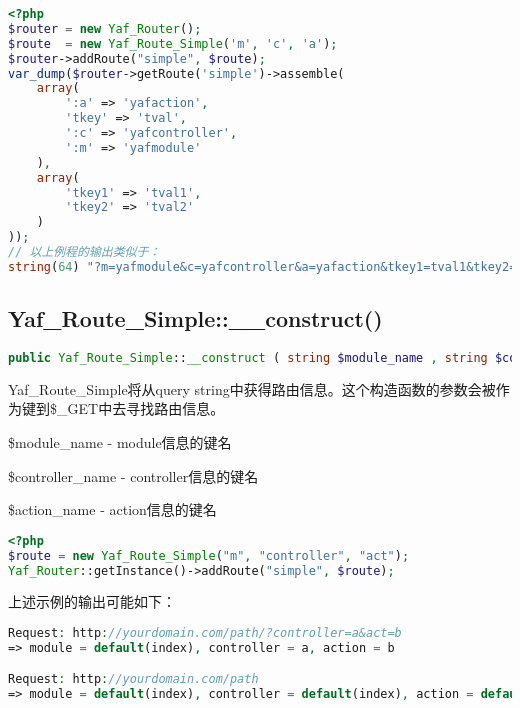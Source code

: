 \begin{lstlisting}[language=PHP]
<?php
$router = new Yaf_Router();
$route  = new Yaf_Route_Simple('m', 'c', 'a');
$router->addRoute("simple", $route);
var_dump($router->getRoute('simple')->assemble(
    array(
        ':a' => 'yafaction',
        'tkey' => 'tval',
        ':c' => 'yafcontroller',
        ':m' => 'yafmodule'
    ),
    array(
        'tkey1' => 'tval1',
        'tkey2' => 'tval2'
    )
));
// 以上例程的输出类似于：
string(64) "?m=yafmodule&c=yafcontroller&a=yafaction&tkey1=tval1&tkey2=tval2"
\end{lstlisting}

\subsection{Yaf\_Route\_Simple::\_\_construct()}




\begin{lstlisting}[language=PHP]
public Yaf_Route_Simple::__construct ( string $module_name , string $controller_name , string $action_name )
\end{lstlisting}

Yaf\_Route\_Simple将从query string中获得路由信息。这个构造函数的参数会被作为键到\$\_GET中去寻找路由信息。

\begin{compactitem}
\item \$module\_name - module信息的键名
\item \$controller\_name - controller信息的键名
\item \$action\_name - action信息的键名
\end{compactitem}




\begin{lstlisting}[language=PHP]
<?php
$route = new Yaf_Route_Simple("m", "controller", "act");
Yaf_Router::getInstance()->addRoute("simple", $route);
\end{lstlisting}

上述示例的输出可能如下：

\begin{lstlisting}[language=PHP]
Request: http://yourdomain.com/path/?controller=a&act=b
=> module = default(index), controller = a, action = b

Request: http://yourdomain.com/path
=> module = default(index), controller = default(index), action = default(index)
\end{lstlisting}


